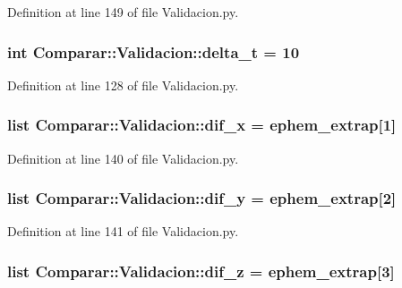 \-Definition at line 149 of file \-Validacion.\-py.

\subsubsection[{delta\-\_\-t}]{\setlength{\rightskip}{0pt plus 5cm}int {\bf \-Comparar\-::\-Validacion\-::delta\-\_\-t} = 10}\label{namespace_comparar_1_1_validacion_acd4618f9a819d0cbbd6ff1ffe502bbf2}


\-Definition at line 128 of file \-Validacion.\-py.

\subsubsection[{dif\-\_\-x}]{\setlength{\rightskip}{0pt plus 5cm}list {\bf \-Comparar\-::\-Validacion\-::dif\-\_\-x} = ephem\-\_\-extrap[1]}\label{namespace_comparar_1_1_validacion_a87897110cb8a4b8db1a08ed8c5318a01}


\-Definition at line 140 of file \-Validacion.\-py.

\subsubsection[{dif\-\_\-y}]{\setlength{\rightskip}{0pt plus 5cm}list {\bf \-Comparar\-::\-Validacion\-::dif\-\_\-y} = ephem\-\_\-extrap[2]}\label{namespace_comparar_1_1_validacion_a33567b3934faabee8f2d98ba8dc472a4}


\-Definition at line 141 of file \-Validacion.\-py.

\subsubsection[{dif\-\_\-z}]{\setlength{\rightskip}{0pt plus 5cm}list {\bf \-Comparar\-::\-Validacion\-::dif\-\_\-z} = ephem\-\_\-extrap[3]}\label{namespace_comparar_1_1_validacion_ac024f04da27ccd64a8e7f43f5ffcf735}


